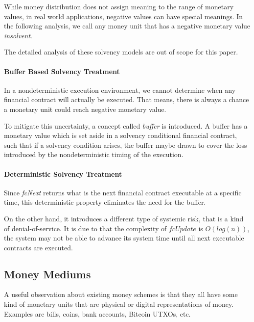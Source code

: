While money distribution does not assign meaning to the range of monetary values, in real world
applications, negative values can have special meanings. In the following analysis, we call any
money unit that has a negative monetary value \textit{insolvent}.

The detailed analysis of these solvency models are out of scope for this paper.

\paragraph{Buffer Based Solvency Treatment}

In a nondeterministic execution environment, we cannot determine when any financial contract will
actually be executed. That means, there is always a chance a monetary unit could reach negative
monetary value.

To mitigate this uncertainty, a concept called \textit{buffer} is introduced. A buffer has a
monetary value which is set aside in a solvency conditional financial contract, such that if a
solvency condition arises, the buffer maybe drawn to cover the loss introduced by the
nondeterministic timing of the execution.

\paragraph{Deterministic Solvency Treatment}

Since \textit{fcNext} returns what is the next financial contract executable at a specific time,
this deterministic property eliminates the need for the buffer.

On the other hand, it introduces a different type of systemic risk, that is a kind of
denial-of-service. It is due to that the complexity of $fcUpdate$ is $O(log(n))$, the system may not
be able to advance its system time until all next executable contracts are executed.

\subsection{Money Mediums}

\begin{displayquote}
A useful observation about existing money schemes is that they all have some kind of monetary units
that are physical or digital representations of money. Examples are bills, coins, bank accounts,
Bitcoin UTXOs, etc. 
\end{displayquote}

